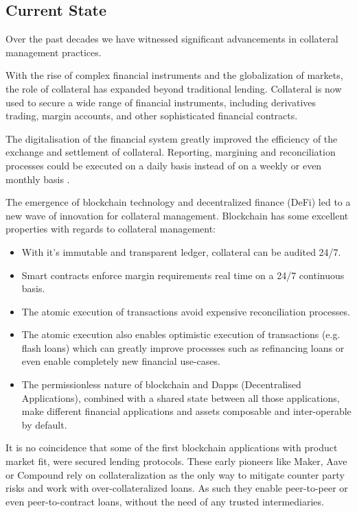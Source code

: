 \documentclass[sigconf,nonacm]{acmart}
\begin{document}
\subsection{Current State}
Over the past decades we have witnessed significant advancements in collateral management practices.

With the rise of complex financial instruments and the globalization of markets, the role of collateral has expanded beyond traditional lending.
Collateral is now used to secure a wide range of financial instruments, including derivatives trading, margin accounts, and other sophisticated financial contracts.

The digitalisation of the financial system greatly improved the efficiency of the exchange and settlement of collateral.
Reporting, margining and reconciliation processes could be executed on a daily basis instead of on a weekly or even monthly basis \cite{simmons2019collateral}.

The emergence of blockchain technology and decentralized finance (DeFi) led to a new wave of innovation for collateral management.
Blockchain has some excellent properties with regards to collateral management:
\begin{itemize}
    \item With it's immutable and transparent ledger, collateral can be audited 24/7.
    \item Smart contracts enforce margin requirements real time on a 24/7 continuous basis.
    \item The atomic execution of transactions avoid expensive reconciliation processes.
    \item The atomic execution also enables optimistic execution of transactions (e.g. flash loans) which can greatly improve processes such as refinancing loans or even enable completely new financial use-cases.
    \item The permissionless nature of blockchain and Dapps (Decentralised Applications), combined with a shared state between all those applications, make different financial applications and assets composable and inter-operable by default.
\end{itemize}

It is no coincidence that some of the first blockchain applications with product market fit, were secured lending protocols.
These early pioneers like Maker\cite{team2017dai}, Aave\cite{thornburg2020aave} or Compound\cite{leshner2019compound} rely on collateralization as the only way to mitigate counter party risks and work with over-collateralized loans.
As such they enable peer-to-peer or even peer-to-contract loans, without the need of any trusted intermediaries.
\end{document}
